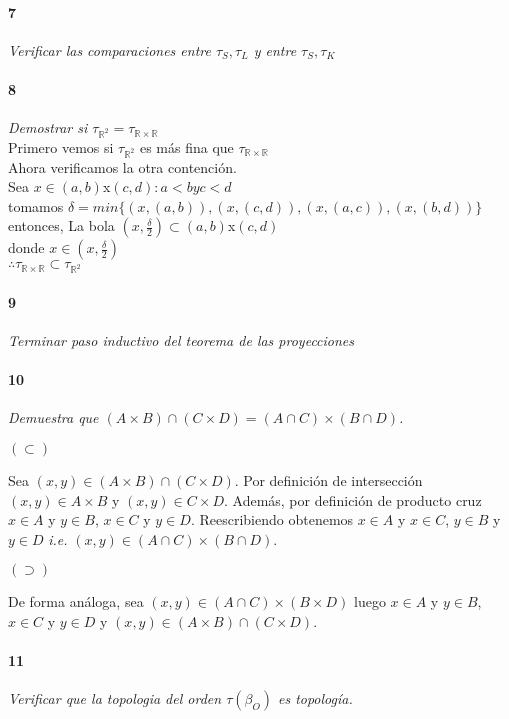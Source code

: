 \documentclass[12pt]{article}
\begin{document}
\paragraph{7}
\textit{Verificar las comparaciones entre $\tau_S, \tau_L$ y entre $\tau_S, \tau_K$}

\paragraph{8}
\textit{Demostrar si $\tau_{\mathbb{R}^2}=\tau_{\mathbb{R} \times \mathbb{R}}$}
\\Primero vemos si \( \tau_{\mathbb{R}^2}\) es más fina que \(\tau_{\mathbb{R} \times \mathbb{R}}\)
\\Ahora verificamos la otra contención.
\\Sea \(x\in(a,b)\)x\((c,d): a<b y c<d\)
\\tomamos \(\delta=min\{(x,(a,b)),(x,(c,d)),(x,(a,c)),(x,(b,d))\}\)
\\entonces, La bola \((x,\frac{\delta}{2})\subset(a,b)\)x\((c,d)\)
\\donde \(x\in(x,\frac{\delta}{2})\)
\\\(\therefore\tau_{\mathbb{R} \times \mathbb{R}}\subset\tau_{\mathbb{R}^2}\)
\paragraph{9}
\textit{Terminar paso inductivo del teorema de las proyecciones}

\paragraph{10}
\textit{Demuestra que $(A \times B) \cap (C \times D)= (A \cap C) \times (B \cap D)$.}

$(\subset)$

Sea $(x,y) \in (A \times B) \cap (C \times D)$. Por definición de intersección $(x,y)\in A\times B$ y $(x,y) \in C\times D$. Además, por definición
de producto cruz $x \in A $ y $y \in B$, $x \in C$ y $y \in D$. Reescribiendo obtenemos $x\in A$ y $x\in C$, $y \in B$ y $y\in D$ \textit{i.e.}  $(x,y) \in (A \cap C)\times (B \cap D)$.

$(\supset)$

De forma análoga, sea $(x,y) \in (A \cap C) \times (B \times D)$ luego  $x \in A $ y $y \in B$, $x \in C$ y $y \in D$ y $(x,y) \in (A \times B) \cap (C \times D)$.

\paragraph{11}
\textit{Verificar que la topologia del orden $\tau(\beta_O)$ es topología.}
\end{document}
